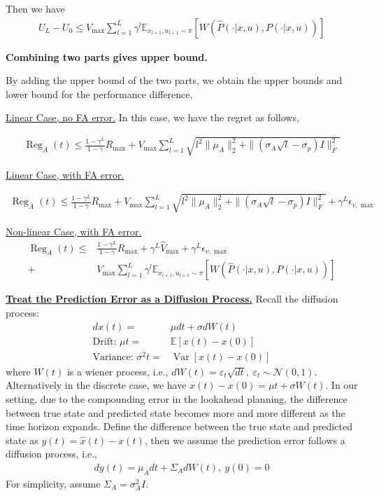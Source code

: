 Then we have
\begin{align*}
    U_L-U_0 \leq V_{\max} \sum_{l=1}^{L} \gamma^l \mathbb{E}_{x_{l+1},u_{l+1}\sim {\pi}}[W(\hat{P}(\cdot \vert x,u),P(\cdot \vert x,u))]
\end{align*}

{\bf Combining two parts gives upper bound.}

By adding the upper bound of the two parts, we obtain the upper bounds and lower bound for the performance difference,

\underline{Linear Case, no FA error.} In this case, we have the regret as follows,

\begin{align*}
  \operatorname{Reg}_A(t) \leq \frac{1-\gamma^L}{1-\gamma}R_{\max}+{V}_{\max}\sum_{l=1}^L \sqrt{l^2 \|\mu_A\|_2^2 + \|(\sigma_A \sqrt{l} - \sigma_p) I\|_F^2}
\end{align*}


\underline{Linear Case, with FA error.} 

\begin{align*}
    \operatorname{Reg}_A(t) \leq \frac{1-\gamma^L}{1-\gamma}R_{\max}+{V}_{\max}\sum_{l=1}^L \sqrt{l^2 \|\mu_A\|_2^2 + \|(\sigma_A \sqrt{l} - \sigma_p) I\|_F^2}  + \gamma^L \epsilon_{v,\max} 
\end{align*}



\underline{Non-linear Case, with FA error.} 
\begin{align*}
    \operatorname{Reg}_A(t) \leq & \frac{1-\gamma^L}{1-\gamma}R_{\max}+\gamma^L \hat{V}_{\max} + \gamma^L \epsilon_{v,\max} \\
    +&  V_{\max} \sum_{l=1}^{L} \gamma^l \mathbb{E}_{x_{l+1},u_{l+1}\sim {\pi}}[W(\hat{P}(\cdot \vert x,u),P(\cdot \vert x,u))]
\end{align*}

\underline{\bf Treat the Prediction Error as a Diffusion Process.} Recall the diffusion process:
\begin{align*}
    dx(t) =& \mu dt + \sigma d W(t) \\
    \text{Drift: } \mu t =& \mathbb{E}[x(t)-x(0)]\\
    \text{Variance: } \sigma^2t =& \operatorname{Var}[x(t)-x(0)] 
\end{align*}
where $W(t)$ is a wiener process, i.e., $dW(t)=\varepsilon_t\sqrt{dt},~\varepsilon_t\sim\mathcal{N}(0,1)$. Alternatively in the discrete case, we have $x(t)-x(0)=\mu t + \sigma W(t)$. In our setting, due to the compounding error in the lookahead planning, the difference between true state and predicted state becomes more and more different as the time horizon expands. Define the difference between the true state and predicted state as $y(t)=\hat{x}(t)-x(t)$, then we assume the prediction error follows a diffusion process, i.e., 
\begin{align*}
    dy(t)=\mu_A dt + \Sigma_A dW(t),~ y(0)=0
\end{align*}
For simplicity, assume $\Sigma_A = \sigma_A^2  I$.

